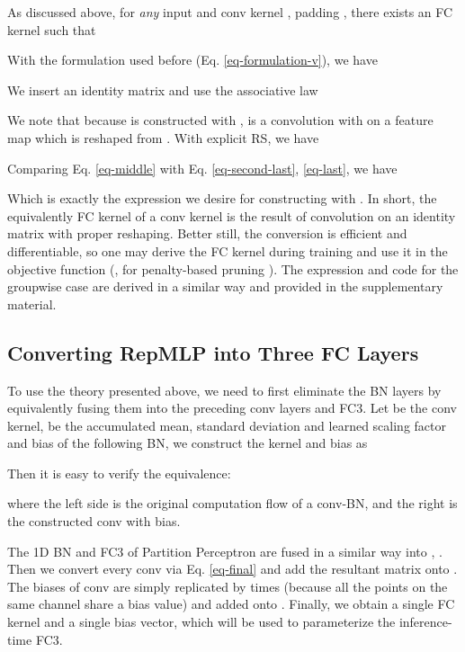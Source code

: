 \documentclass[10pt,twocolumn,letterpaper]{article}
\begin{document}
As discussed above, for \textit{any} input  and conv kernel , padding , there exists an FC kernel  such that

With the formulation used before (Eq. \ref{eq-formulation-v}), we have

We insert an identity matrix   and use the associative law


We note that because  is constructed with ,  is a convolution with  on a feature map  which is reshaped from . With explicit RS, we have



Comparing Eq. \ref{eq-middle} with Eq. \ref{eq-second-last}, \ref{eq-last}, we have

Which is exactly the expression we desire for constructing  with . In short, the equivalently FC kernel of a conv kernel is the result of convolution on an identity matrix with proper reshaping. Better still, the conversion is efficient and differentiable, so one may derive the FC kernel during training and use it in the objective function (\eg, for penalty-based pruning \cite{han2015learning,molchanov2016pruning}). The expression and code for the groupwise case are derived in a similar way and provided in the supplementary material.


\subsection{Converting RepMLP into Three FC Layers}

To use the theory presented above, we need to first eliminate the BN layers by equivalently fusing them into the preceding conv layers and FC3. Let  be the conv kernel,  be the accumulated mean, standard deviation and learned scaling factor and bias of the following BN, we construct the kernel  and bias  as

Then it is easy to verify the equivalence:

where the left side is the original computation flow of a conv-BN, and the right is the constructed conv with bias.
 
The 1D BN and FC3 of Partition Perceptron are fused in a similar way into , . Then we convert every conv via Eq. \ref{eq-final} and add the resultant matrix onto . The biases of conv are simply replicated by  times (because all the points on the same channel share a bias value) and added onto . Finally, we obtain a single FC kernel and a single bias vector, which will be used to parameterize the inference-time FC3.
\end{document}
